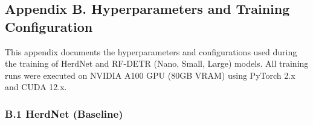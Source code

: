 \subsection*{Appendix B. Hyperparameters and Training Configuration}

This appendix documents the hyperparameters and configurations used during the training of HerdNet and RF-DETR (Nano, Small, Large) models. All training runs were executed on NVIDIA A100 GPU (80GB VRAM) using PyTorch 2.x and CUDA 12.x.

\subsubsection*{B.1 HerdNet (Baseline)}


